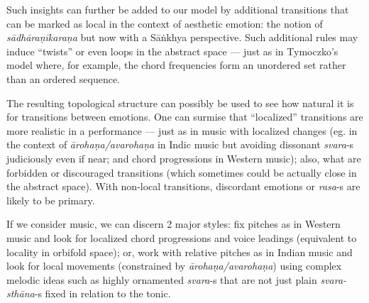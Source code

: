 Such insights can further be added to our model by additional transitions that can be marked as local in the context of aesthetic emotion: the notion of \textsl{sādhāraṇīkaraṇa} but now with a Sāṅkhya perspective. Such additional rules may induce “twists” or even loops in the abstract space --- just as in Tymoczko’s model where, for example, the chord frequencies form an unordered set rather than an ordered sequence.

The resulting topological structure can possibly be used to see how natural it is for transitions between emotions. One can surmise that “localized” transitions are more realistic in a performance --- just as in music with localized changes (eg. in the context of \textsl{ārohaṇa/avarohaṇa} in Indic music but avoiding dissonant \textsl{svara}-s judiciously even if near; and chord progressions in Western music); also, what are forbidden or discouraged transitions (which sometimes could be actually close in the abstract space). With non-local transitions, discordant emotions or \textsl{rasa}-s are likely to be primary. 

If we consider music, we can discern 2 major styles: fix pitches as in Western music and look for localized chord progressions and voice leadings (equivalent to locality in orbifold space); or, work with relative pitches as in Indian music and look for local movements (constrained by \textsl{ārohaṇa/avarohaṇa}) using complex melodic ideas such as highly ornamented \textsl{svara}-s that are not just plain \textsl{svara-sthāna}-s fixed in relation to the tonic. 

